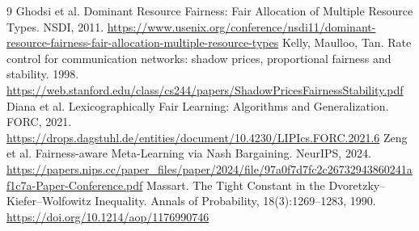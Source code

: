 \documentclass[UTF8,11pt,fontset=fandol]{ctexart}
\begin{document}
\begin{thebibliography}{9}
Ghodsi et al. Dominant Resource Fairness: Fair Allocation of Multiple Resource Types. NSDI, 2011.
\url{https://www.usenix.org/conference/nsdi11/dominant-resource-fairness-fair-allocation-multiple-resource-types}
Kelly, Maulloo, Tan. Rate control for communication networks: shadow prices, proportional fairness and stability. 1998.
\url{https://web.stanford.edu/class/cs244/papers/ShadowPricesFairnessStability.pdf}
Diana et al. Lexicographically Fair Learning: Algorithms and Generalization. FORC, 2021.
\url{https://drops.dagstuhl.de/entities/document/10.4230/LIPIcs.FORC.2021.6}
Zeng et al. Fairness-aware Meta-Learning via Nash Bargaining. NeurIPS, 2024.
\url{https://papers.nips.cc/paper_files/paper/2024/file/97a0f7d7fc2c26732943860241af1c7a-Paper-Conference.pdf}
Massart. The Tight Constant in the Dvoretzky--Kiefer--Wolfowitz Inequality. Annals of Probability, 18(3):1269--1283, 1990.
\url{https://doi.org/10.1214/aop/1176990746}
\end{thebibliography}
\end{document}
